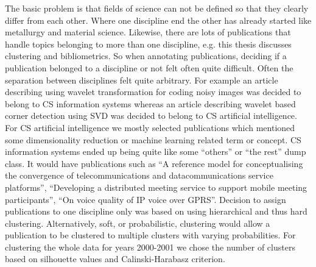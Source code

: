 The basic problem is that fields of science can not be 
defined so that they clearly differ from each other. Where one 
discipline end the other has already started like metallurgy and 
material science. Likewise, there are lots of publications that 
handle topics belonging to more than one discipline, e.g. this 
thesis discusses clustering and bibliometrics. So when annotating 
publications, deciding if a publication belonged to
a discipline or not felt often quite difficult. Often the 
separation between disciplines felt quite arbitrary. For example
an article describing using wavelet transformation for coding noisy
images was decided to belong to CS information systems whereas an
article describing wavelet based corner detection using SVD was
decided to belong to CS artificial intelligence.
For CS artificial intelligence we mostly selected publications 
which mentioned some dimensionality reduction or machine learning 
related term or concept. CS information systems ended up being 
quite like some ``others'' or ``the rest'' dump class.
It would have publications such as
``A reference model for conceptualising the convergence of 
telecommunications and datacommunications service platforms'',
``Developing a distributed meeting service to support mobile 
meeting participants'',
``On voice quality of IP voice over GPRS''.
Decision to assign publications to one discipline only was based 
on using hierarchical and thus hard clustering. Alternatively, 
soft, or probabilistic, clustering would allow a publication to 
be clustered to multiple clusters with varying probabilities. 
For clustering the whole data for years 2000-2001 we chose the 
number of clusters based on silhouette values and 
Calinski-Harabasz criterion.



